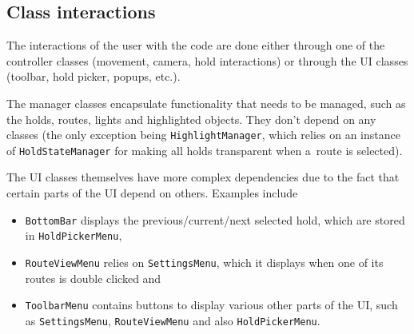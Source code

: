 \subsection{Class interactions}

The interactions of the user with the code are done either through one of the controller classes (movement, camera, hold interactions) or through the UI classes (toolbar, hold picker, popups, etc.).

The manager classes encapsulate functionality that needs to be managed, such as the holds, routes, lights and highlighted objects.
They don't depend on any classes (the only exception being \verb|HighlightManager|, which relies on an instance of \verb|HoldStateManager| for making all holds transparent when a~route is selected).

The UI classes themselves have more complex dependencies due to the fact that certain parts of the UI depend on others. 
Examples include
\begin{itemize}
		\item \verb|BottomBar| displays the previous/current/next selected hold, which are stored in \verb|HoldPickerMenu|,
		\item \verb|RouteViewMenu| relies on \verb|SettingsMenu|, which it displays when one of its routes is double clicked and
		\item \verb|ToolbarMenu| contains buttons to display various other parts of the UI, such as \verb|SettingsMenu|, \verb|RouteViewMenu| and also \verb|HoldPickerMenu|.
\end{itemize}
